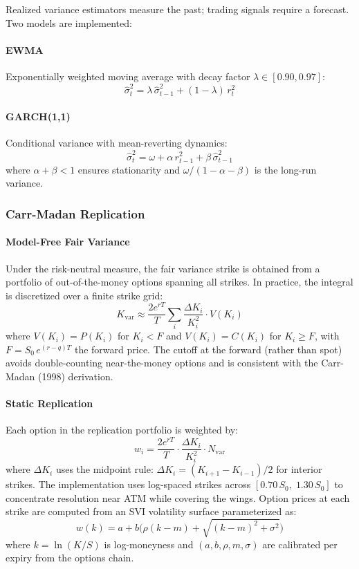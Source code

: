 Realized variance estimators measure the past; trading signals require a forecast. Two models are implemented:

\paragraph{EWMA}
Exponentially weighted moving average with decay factor $\lambda \in [0.90, 0.97]$:
\[
\hat\sigma^2_t = \lambda \, \hat\sigma^2_{t-1} + (1 - \lambda) \, r_t^2
\]

\paragraph{GARCH(1,1)}
Conditional variance with mean-reverting dynamics:
\[
\hat\sigma^2_t = \omega + \alpha \, r_{t-1}^2 + \beta \, \hat\sigma^2_{t-1}
\]
where $\alpha + \beta < 1$ ensures stationarity and $\omega / (1 - \alpha - \beta)$ is the long-run variance.

\subsubsection{Carr-Madan Replication}

\paragraph{Model-Free Fair Variance}

Under the risk-neutral measure, the fair variance strike is obtained from a portfolio of out-of-the-money options spanning all strikes. In practice, the integral is discretized over a finite strike grid:
\[
K_{\text{var}} \approx \frac{2 e^{rT}}{T} \sum_{i} \frac{\Delta K_i}{K_i^2} \cdot V(K_i)
\]
where $V(K_i) = P(K_i)$ for $K_i < F$ and $V(K_i) = C(K_i)$ for $K_i \geq F$, with $F = S_0 \, e^{(r - q)T}$ the forward price. The cutoff at the forward (rather than spot) avoids double-counting near-the-money options and is consistent with the Carr-Madan (1998) derivation.

\paragraph{Static Replication}

Each option in the replication portfolio is weighted by:
\[
w_i = \frac{2 e^{rT}}{T} \cdot \frac{\Delta K_i}{K_i^2} \cdot N_{\text{var}}
\]
where $\Delta K_i$ uses the midpoint rule: $\Delta K_i = (K_{i+1} - K_{i-1}) / 2$ for interior strikes. The implementation uses log-spaced strikes across $[0.70\,S_0, \; 1.30\,S_0]$ to concentrate resolution near ATM while covering the wings. Option prices at each strike are computed from an SVI volatility surface parameterized as:
\[
w(k) = a + b \bigl(\rho (k - m) + \sqrt{(k - m)^2 + \sigma^2}\bigr)
\]
where $k = \ln(K/S)$ is log-moneyness and $(a, b, \rho, m, \sigma)$ are calibrated per expiry from the options chain.

